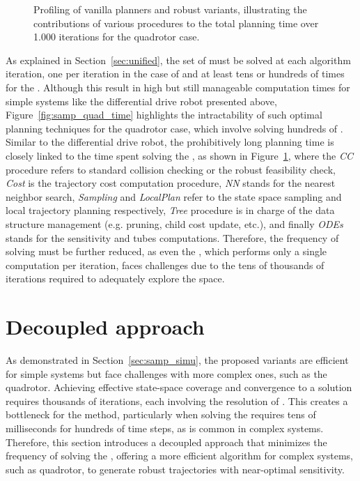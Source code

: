 \begin{figure} [htp]
    \centering
     
    \caption{Profiling of vanilla planners and robust variants, illustrating the contributions of various procedures to the total planning time over 1.000 iterations for the quadrotor case.
    }%
    \label{fig:profiling_quad}%
\end{figure}

As explained in Section~\ref{sec:unified}, the set of  must be solved at each algorithm iteration, one per iteration in the case of  and at least tens or hundreds of times for the .
Although this result in high but still manageable computation times for simple systems like the differential drive robot presented above, Figure~\ref{fig:samp_quad_time} highlights the intractability of such optimal planning techniques for the quadrotor case, which involve solving hundreds of .
Similar to the differential drive robot, the prohibitively long planning time is closely linked to the time spent solving the , as shown in Figure~\ref{fig:profiling_quad}, where the \emph{CC} procedure refers to standard collision checking or the robust feasibility check, \emph{Cost} is the trajectory cost computation procedure, \emph{NN} stands for the nearest neighbor search, \emph{Sampling} and \emph{LocalPlan} refer to the state space sampling and local trajectory planning respectively, \emph{Tree} procedure is in charge of the data structure management (e.g. pruning, child cost update, etc.), and finally \emph{ODEs} stands for the sensitivity and tubes computations.
Therefore, the frequency of  solving must be further reduced, as even the , which performs only a single computation per iteration, faces challenges due to the tens of thousands of iterations required to adequately explore the space.

\section{Decoupled approach}\label{sec:decoupled}

As demonstrated in Section~\ref{sec:samp_simu}, the proposed  variants are efficient for simple systems but face challenges with more complex ones, such as the quadrotor. 
Achieving effective state-space coverage and convergence to a solution requires thousands of iterations, each involving the resolution of . 
This creates a bottleneck for the method, particularly when solving the  requires tens of milliseconds for hundreds of time steps, as is common in complex systems.
Therefore, this section introduces a decoupled approach that minimizes the frequency of solving the , offering a more efficient algorithm for complex systems, such as quadrotor, to generate robust trajectories with near-optimal sensitivity.

